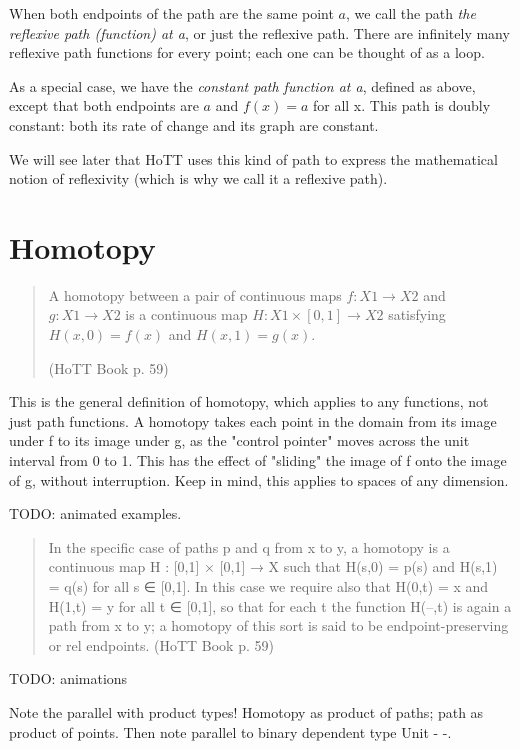 \documentclass{article}
\begin{document}
When both endpoints of the path are the same point \(a\), we call the
path \emph{the reflexive path (function) at a}, or just the reflexive
path.  There are infinitely many reflexive path functions for every
point; each one can be thought of as a loop.

As a special case, we have the \emph{constant path function at a},
defined as above, except that both endpoints are \(a\) and \(f(x)=a\)
for all x.  This path is doubly constant: both its rate of change and
its graph are constant.

We will see later that HoTT uses this kind of path to express the
mathematical notion of reflexivity (which is why we call it a
reflexive path).

\section{Homotopy}

\begin{quote}

A homotopy between a pair of continuous maps \(f : X1 → X2\) and \(g :
X1 → X2\) is a continuous map \(H : X1 × [0, 1] → X2\) satisfying
\(H(x, 0) = f (x)\) and \(H(x, 1) = g(x)\).

(HoTT Book p. 59)
\end{quote}

This is the general definition of homotopy, which applies to any
functions, not just path functions.  A homotopy takes each point in
the domain from its image under f to its image under g, as the
"control pointer" moves across the unit interval from 0 to 1.  This
has the effect of "sliding" the image of f onto the image of g,
without interruption.  Keep in mind, this applies to spaces of any
dimension.

TODO: animated examples.

\begin{quote}
In the specific case of paths p and q from x to y, a homotopy is a
continuous map H : [0,1] × [0,1] → X such that H(s,0) = p(s) and
H(s,1) = q(s) for all s ∈ [0,1]. In this case we require also that
H(0,t) = x and H(1,t) = y for all t ∈ [0,1], so that for each t the
function H(–,t) is again a path from x to y; a homotopy of this sort
is said to be endpoint-preserving or rel endpoints.  (HoTT Book p. 59)
\end{quote}

TODO: animations

Note the parallel with product types!  Homotopy as product of paths;
path as product of points.  Then note parallel to binary dependent
type Unit - -.
\end{document}
